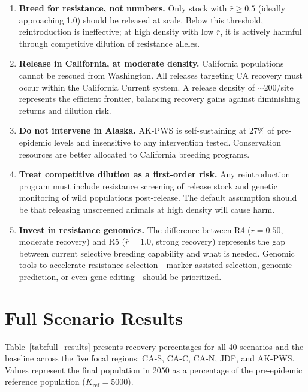 \documentclass[11pt,a4paper]{article}
\newcommand{\rbar}{\ensuremath{\bar{r}}}
\begin{document}
\begin{enumerate}[leftmargin=2em]
  \item \textbf{Breed for resistance, not numbers.} Only stock with $\rbar \geq 0.5$ (ideally approaching 1.0) should be released at scale. Below this threshold, reintroduction is ineffective; at high density with low $\rbar$, it is actively harmful through competitive dilution of resistance alleles.
  
  \item \textbf{Release in California, at moderate density.} California populations cannot be rescued from Washington. All releases targeting CA recovery must occur within the California Current system. A release density of ${\sim}$200/site represents the efficient frontier, balancing recovery gains against diminishing returns and dilution risk.
  
  \item \textbf{Do not intervene in Alaska.} AK-PWS is self-sustaining at 27\% of pre-epidemic levels and insensitive to any intervention tested. Conservation resources are better allocated to California breeding programs.
  
  \item \textbf{Treat competitive dilution as a first-order risk.} Any reintroduction program must include resistance screening of release stock and genetic monitoring of wild populations post-release. The default assumption should be that releasing unscreened animals at high density will cause harm.
  
  \item \textbf{Invest in resistance genomics.} The difference between R4 ($\rbar=0.50$, moderate recovery) and R5 ($\rbar=1.0$, strong recovery) represents the gap between current selective breeding capability and what is needed. Genomic tools to accelerate resistance selection---marker-assisted selection, genomic prediction, or even gene editing---should be prioritized.
\end{enumerate}

\clearpage
\appendix
\section{Full Scenario Results}

Table~\ref{tab:full_results} presents recovery percentages for all 40 scenarios and the baseline across the five focal regions: CA-S, CA-C, CA-N, JDF, and AK-PWS. Values represent the final population in 2050 as a percentage of the pre-epidemic reference population ($K_\text{ref}=5000$).
\end{document}
